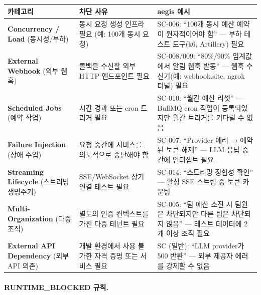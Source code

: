 \documentclass[11pt,a4paper,openright,twoside]{report}
\begin{document}
\begin{longtable}{p{3.5cm}p{4cm}p{5.5cm}}
\toprule
\textbf{카테고리} & \textbf{차단 사유} & \textbf{aegis 예시} \\
\midrule
\endhead
\bottomrule
\endfoot

\textbf{Concurrency / Load} (동시성/부하) &
  동시 요청 생성 인프라 필요 (예: 100개 동시 요청) &
  SC-006: ``100개 동시 예산 예약이 원자적이어야 함'' --- 부하 테스트 도구(k6, Artillery) 필요 \\
\addlinespace

\textbf{External Webhook} (외부 웹훅) &
  콜백을 수신할 외부 HTTP 엔드포인트 필요 &
  SC-008/009: ``80\%/90\% 임계값에서 알림 웹훅 발동'' --- 웹훅 수신기(예: webhook.site, ngrok 터널) 필요 \\
\addlinespace

\textbf{Scheduled Jobs} (예약 작업) &
  시간 경과 또는 cron 트리거 필요 &
  SC-010: ``월간 예산 리셋'' --- BullMQ cron 작업이 등록되었지만 월간 트리거를 기다릴 수 없음 \\
\addlinespace

\textbf{Failure Injection} (장애 주입) &
  요청 중간에 서비스를 의도적으로 중단해야 함 &
  SC-007: ``Provider 에러 → 예약된 토큰 해제'' --- LLM 응답 중간에 인터셉트 필요 \\
\addlinespace

\textbf{Streaming Lifecycle} (스트리밍 생명주기) &
  SSE/WebSocket 장기 연결 테스트 필요 &
  SC-014: ``스트리밍 정합성 확인'' --- 활성 SSE 스트림 중 토큰 카운팅 \\
\addlinespace

\textbf{Multi-Organization} (다중 조직) &
  별도의 인증 컨텍스트를 가진 다중 테넌트 필요 &
  SC-005: ``팀 예산 소진 시 팀원은 차단되지만 다른 팀은 차단되지 않음'' --- 테스트 데이터에 2개 이상 조직 필요 \\
\addlinespace

\textbf{External API Dependency} (외부 API 의존) &
  개발 환경에서 사용 불가한 자격 증명 또는 서비스 필요 &
  SC (일반): ``LLM provider가 500 반환'' --- 외부 제공자 에러를 강제할 수 없음 \\
\bottomrule
\end{longtable}

\paragraph{RUNTIME\_BLOCKED 규칙.}
\end{document}
